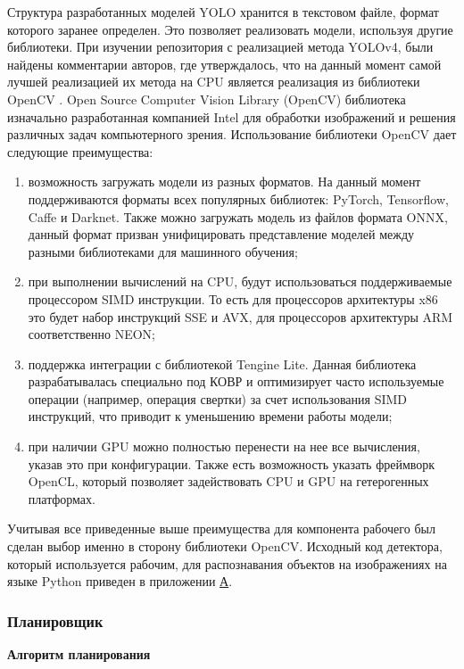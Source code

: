 Структура разработанных моделей YOLO хранится в текстовом файле, формат которого заранее определен. Это позволяет реализовать модели, 
используя другие библиотеки. При изучении репозитория с реализацией метода YOLOv4, были найдены комментарии авторов, где утверждалось, 
что на данный момент самой лучшей реализацией их метода на CPU является реализация из библиотеки OpenCV \cite{YOLO4_IMPL}. 
Open Source Computer Vision Library (OpenCV) библиотека изначально разработанная компанией Intel для обработки изображений 
и решения различных задач компьютерного зрения. Использование библиотеки OpenCV дает следующие преимущества:

\begin{enumerate}
\item возможность загружать модели из разных форматов. На данный момент поддерживаются форматы всех популярных библиотек: 
PyTorch, Tensorflow, Caffe и Darknet. Также можно загружать модель из файлов формата ONNX, данный формат призван 
унифицировать представление моделей между разными библиотеками для машинного обучения;
\item при выполнении вычислений на CPU, будут использоваться поддерживаемые процессором SIMD инструкции. То есть для процессоров 
архитектуры x86 это будет набор инструкций SSE и AVX, для процессоров архитектуры ARM соответственно NEON;
\item поддержка интеграции с библиотекой Tengine Lite. Данная библиотека разрабатывалась специально под КОВР и оптимизирует
часто используемые операции (например, операция свертки) за счет использования SIMD инструкций, что приводит 
к уменьшению времени работы модели;
\item при наличии GPU можно полностью перенести на нее все вычисления, указав это при конфигурации. Также есть возможность 
указать фреймворк OpenCL, который позволяет задействовать CPU и GPU на гетерогенных платформах.
\end{enumerate}

Учитывая все приведенные выше преимущества для компонента рабочего был сделан выбор именно в сторону библиотеки OpenCV. 
Исходный код детектора, который используется рабочим, для распознавания объектов на изображениях на языке Python приведен 
в приложении \hyperlink{a-app}{А}.

\subsubsection{Планировщик}

\textbf{Алгоритм планирования}


